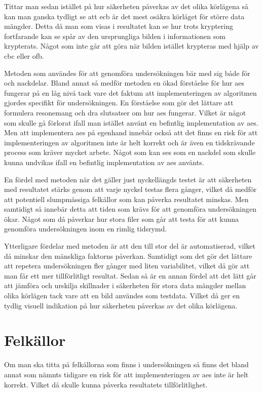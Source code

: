 Tittar man sedan istället på hur säkerheten påverkas av det olika körlägena så kan man ganska tydligt se att \acrshort{ecb} är det mest osäkra körläget för större data mängder.
Detta då man som visas i resultatet kan se hur trots kryptering fortfarande kan se spår av den ursprungliga bilden i informationen som krypterats. Något som inte
går att göra när bilden istället krypteras med hjälp av \acrshort{cbc} eller \acrshort{ofb}.

Metoden som användes för att genomföra undersökningen bär med sig både för och nackdelar. Bland annat så medför metoden en ökad förståelse för hur \acrfull{aes} fungerar
på en låg nivå tack vare det faktum att implementeringen av algoritmen gjordes specifikt för undersökningen. En förståelse som gör det lättare att formulera resonemang och
dra slutsatser om hur \acrshort{aes} fungerar. Vilket är något som skulle gå förlorat ifall man istället använt en befintlig implementation av \acrshort{aes}. Men att implementera
\acrshort{aes} på egenhand innebär också att det finns en risk för att implementeringen av algoritmen inte är helt korrekt och är även en tidskrävande process som kräver
mycket arbete. Något som kan ses som en nackdel som skulle kunna undvikas ifall en befintlig implementation av \acrshort{aes} använts.

En fördel med metoden när det gäller just nyckellängds testet är att säkerheten med resultatet stärks genom att varje nyckel testas flera gånger, vilket då medför att
potentiell slumpmässiga felkällor som kan påverka resultatet minskas. Men samtidigt så innebär detta att tiden som krävs för att genomföra undersökningen ökar. Något som
då påverkar hur stora filer som går att testa för att kunna genomföra undersökningen inom en rimlig tidsrymd.

Ytterligare fördelar med metoden är att den till stor del är automatiserad, vilket då minskar den mänskliga faktorns påverkan. Samtidigt som det gör det lättare att
repetera undersökningen fler gånger med liten variabilitet, vilket då gör att man får ett mer tillförlitligt resultat. Sedan så är
en annan fördel att det lätt går att jämföra och urskilja skillnader i säkerheten för stora data mängder mellan olika körlägen tack vare att en bild användes som testdata.
Vilket då ger en tydlig visuell indikation på hur säkerheten påverkas av det olika körlägena.

\section{Felkällor} %
Om man ska titta på felkällorna som finns i undersökningen så finns det bland annat som nämnts tidigare en risk för att implementeringen av \acrshort{aes} inte är helt korrekt. Vilket
då skulle kunna påverka resultatets tillförlitlighet.

